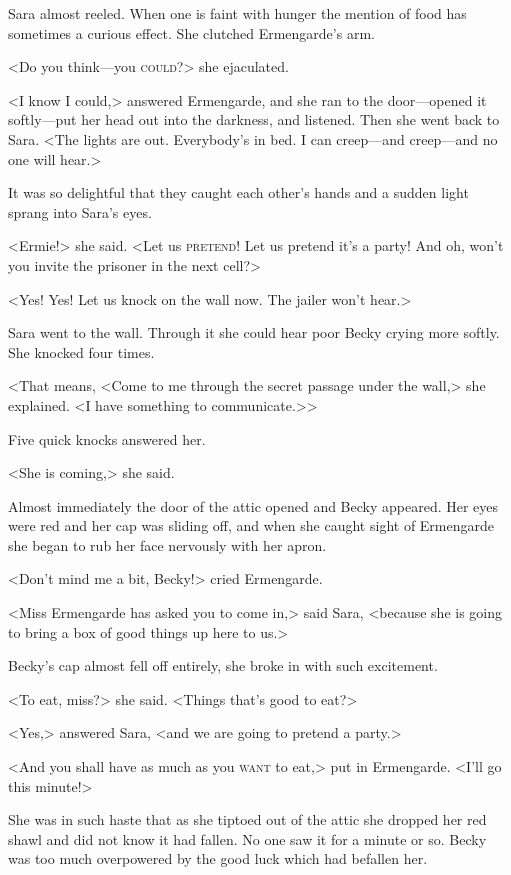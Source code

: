 Sara almost reeled. When one is faint with hunger the mention of food has sometimes a curious effect. She clutched Ermengarde's arm.

<Do you think—you \textsc{could}?> she ejaculated.

<I know I could,> answered Ermengarde, and she ran to the door—opened it softly—put her head out into the darkness, and listened. Then she went back to Sara. <The lights are out. Everybody's in bed. I can creep—and creep—and no one will hear.>

It was so delightful that they caught each other's hands and a sudden light sprang into Sara's eyes.

<Ermie!> she said. <Let us \textsc{pretend}! Let us pretend it's a party! And oh, won't you invite the prisoner in the next cell?>

<Yes! Yes! Let us knock on the wall now. The jailer won't hear.>

Sara went to the wall. Through it she could hear poor Becky crying more softly. She knocked four times.

<That means, <Come to me through the secret passage under the wall,> she explained. <I have something to communicate.>>

Five quick knocks answered her.

<She is coming,> she said.

Almost immediately the door of the attic opened and Becky appeared. Her eyes were red and her cap was sliding off, and when she caught sight of Ermengarde she began to rub her face nervously with her apron.

<Don't mind me a bit, Becky!> cried Ermengarde.

<Miss Ermengarde has asked you to come in,> said Sara, <because she is going to bring a box of good things up here to us.>

Becky's cap almost fell off entirely, she broke in with such excitement.

<To eat, miss?> she said. <Things that's good to eat?>

<Yes,> answered Sara, <and we are going to pretend a party.>

<And you shall have as much as you \textsc{want} to eat,> put in Ermengarde. <I'll go this minute!>

She was in such haste that as she tiptoed out of the attic she dropped her red shawl and did not know it had fallen. No one saw it for a minute or so. Becky was too much overpowered by the good luck which had befallen her.

